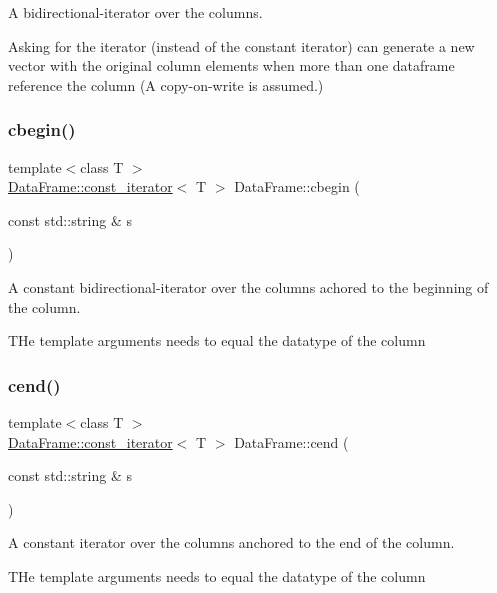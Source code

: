 A bidirectional-\/iterator over the columns. 

Asking for the iterator (instead of the constant iterator) can generate a new vector with the original column elements when more than one dataframe reference the column (A copy-\/on-\/write is assumed.) \mbox{\label{classDataFrame_a2c869adf1441f604eaa1e629e7e8c8f4}} 
\subsubsection{\texorpdfstring{cbegin()}{cbegin()}}
{\footnotesize\ttfamily template$<$class T $>$ \\
\hyperlink{classDataFrame_1_1const__iterator}{Data\+Frame\+::const\+\_\+iterator}$<$ T $>$ Data\+Frame\+::cbegin (\begin{DoxyParamCaption}\item[{const std\+::string \&}]{s }\end{DoxyParamCaption})}



A constant bidirectional-\/iterator over the columns achored to the beginning of the column. 

T\+He template arguments needs to equal the datatype of the column \mbox{\label{classDataFrame_a89d6883d335d9a92682b88a995fd3547}} 
\subsubsection{\texorpdfstring{cend()}{cend()}}
{\footnotesize\ttfamily template$<$class T $>$ \\
\hyperlink{classDataFrame_1_1const__iterator}{Data\+Frame\+::const\+\_\+iterator}$<$ T $>$ Data\+Frame\+::cend (\begin{DoxyParamCaption}\item[{const std\+::string \&}]{s }\end{DoxyParamCaption})}



A constant iterator over the columns anchored to the end of the column. 

T\+He template arguments needs to equal the datatype of the column \mbox{\label{classDataFrame_a4b4198c63e6ed421968303e872beb807}} 
